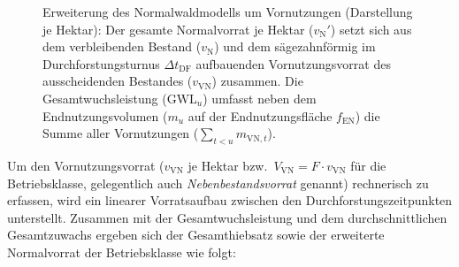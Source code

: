 \documentclass[twocolumn, paper=a4, fontsize=10pt]{scrartcl}
\begin{document}
\begin{figure}[!htbp]
  \caption{Erweiterung des Normalwaldmodells um Vornutzungen (Darstellung je Hektar): Der gesamte Normalvorrat je Hektar ($v_{\text{N}}'$) setzt sich aus dem verbleibenden Bestand ($v_{\text{N}}$) und dem sägezahnförmig im Durchforstungsturnus $\Delta t_{\text{DF}}$ aufbauenden Vornutzungsvorrat des ausscheidenden Bestandes ($v_{\text{VN}}$) zusammen. Die Gesamtwuchsleistung ($\text{GWL}_u$) umfasst neben dem Endnutzungsvolumen ($m_u$ auf der Endnutzungsfläche $f_{\text{EN}}$) die Summe aller Vornutzungen ($\sum_{t < u} m_{\text{VN},t}$).}
  \label{fig:normalwald_vornutzung}
\end{figure}

Um den Vornutzungsvorrat ($v_{\text{VN}}$ je Hektar bzw.\ $V_{\text{VN}} = F \cdot v_{\text{VN}}$ für die Betriebsklasse, gelegentlich auch \emph{Nebenbestandsvorrat} genannt) rechnerisch zu erfassen, wird ein linearer Vorratsaufbau zwischen den Durchforstungszeitpunkten unterstellt. Zusammen mit der Gesamtwuchsleistung und dem durchschnittlichen Gesamtzuwachs ergeben sich der Gesamthiebsatz sowie der erweiterte Normalvorrat der Betriebsklasse wie folgt:
\end{document}
